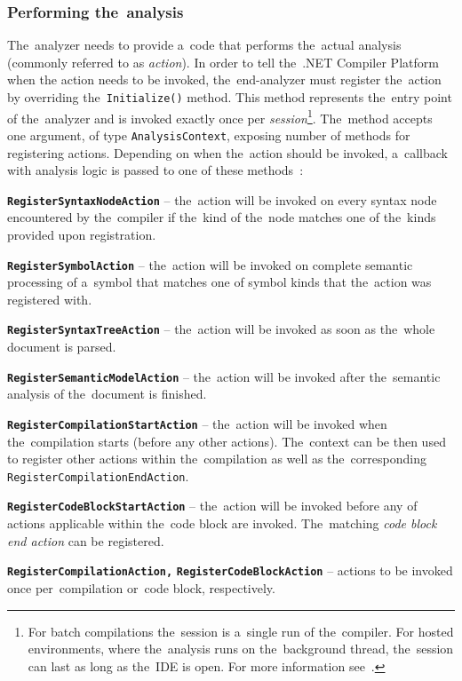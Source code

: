 \documentclass[
  digital, %
  table,   %
  lof,     %
  lot,     %
  oneside,
]{fithesis3}
\begin{document}
\subsubsection{\textbf{Performing the~analysis}}
The~analyzer needs to provide a~code that performs the~actual analysis (commonly referred to as \textit{action}). In order to tell the~.NET Compiler Platform when the action needs to be invoked, the~end-analyzer must register the~action by overriding the~\texttt{Initialize()} method. This method represents the~entry point of the~analyzer and is invoked exactly once per \textit{session}\footnote{For batch compilations the~session is a~single run of the~compiler. For hosted environments, where the~analysis runs on the~background thread, the~session can last as long as the~IDE is open. For more information see~\cite{analyzer-action-semantics}.}. The~method accepts one argument, of type \texttt{AnalysisContext}, exposing number of methods for registering actions. Depending on when the~action should be invoked, a~callback with analysis logic is passed to one of these methods~\cite{analyzer-action-semantics}:

\smallskip
\begin{compactitem}
  \item[\texttt{\textbf{RegisterSyntaxNodeAction}}] -- the~action will be invoked on every syntax node encountered by the~compiler if the~kind of the~node matches one of the~kinds provided upon registration.
  
  \item[\texttt{\textbf{RegisterSymbolAction}}] -- the~action will be invoked on complete semantic processing of a~symbol that matches one of symbol kinds that the~action was registered with.
  
  \item[\texttt{\textbf{RegisterSyntaxTreeAction}}] -- the~action will be invoked as soon as the~whole document is parsed.
  
  \item[\texttt{\textbf{RegisterSemanticModelAction}}] -- the~action will be invoked after the~semantic analysis of the~document is finished.
  
  \item[\texttt{\textbf{RegisterCompilationStartAction}}] -- the~action will be invoked when the~compilation starts (before any other actions). The~context can be then used to register other actions within the~compilation as well as the~corresponding \texttt{RegisterCompilationEndAction}.
  
  \item[\texttt{\textbf{RegisterCodeBlockStartAction}}] -- the~action will be invoked before any of actions applicable within the~code block are invoked. The~matching \textit{code block end action} can be registered.
  
  \item[\texttt{\textbf{RegisterCompilationAction,}}] \texttt{\textbf{RegisterCodeBlockAction}} -- actions to be invoked once per~compilation or~code block, respectively.
\end{compactitem}
\end{document}
